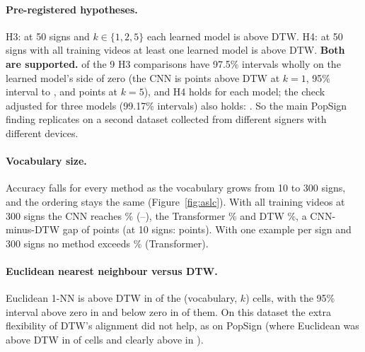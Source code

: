 \paragraph{Pre-registered hypotheses.} H3: at 50 signs and $k\in\{1,2,5\}$ each learned model is above DTW. H4: at 50 signs with all training
videos at least one learned model is above DTW. \textbf{Both are supported.} \cznHOneBelowZero{} of the 9 H3 comparisons have 97.5\%
intervals wholly on the learned model's side of zero (the CNN is \czdifCnnVFiftyKOne{} points above DTW at $k=1$, 95\% interval
\czdifLoCnnVFiftyKOne{} to \czdifHiCnnVFiftyKOne{}, and \czdifCnnVFiftyKFive{} points at $k=5$), and H4 holds for each model; the check adjusted for
three models (99.17\% intervals) also holds: \czhTwoAdjSupported. So the main PopSign finding replicates on a second dataset collected from different
signers with different devices.

\paragraph{Vocabulary size.} Accuracy falls for every method as the vocabulary grows from 10 to 300 signs, and the ordering stays the same
(Figure~\ref{fig:aslc}). With all training videos at 300 signs the CNN reaches \czaccCnnVThreeHundredKAll\%
(\czaccLoCnnVThreeHundredKAll--\czaccHiCnnVThreeHundredKAll), the Transformer \czaccTransVThreeHundredKAll\% and DTW
\czaccDtwVThreeHundredKAll\%, a CNN-minus-DTW gap of \czdifCnnVThreeHundredKAll{} points (at 10 signs: \czdifCnnVTenKAll{} points). With one
example per sign and 300 signs no method exceeds \czaccTransVThreeHundredKOne\% (Transformer).

\paragraph{Euclidean nearest neighbour versus DTW.} Euclidean 1-NN is above DTW in \cznEuclidAhead{} of the \cznEuclidCells{} (vocabulary, $k$)
cells, with the 95\% interval above zero in \cznEuclidAheadExcl{} and below zero in \cznEuclidBehindExcl{} of them. On this dataset the
extra flexibility of DTW's alignment did not help, as on PopSign (where Euclidean was above DTW in \nEuclidAhead{} of \nEuclidCells{} cells and
clearly above in \nEuclidAheadExcl{}).

